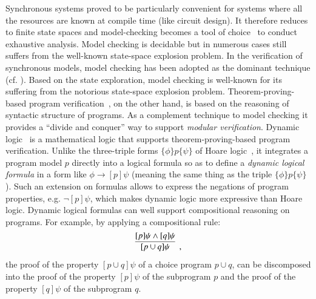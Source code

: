 \documentclass{fcs}
\begin{document}
Synchronous systems proved to be particularly convenient for systems where all the resources are known at compile time (like circuit design).
It therefore reduces to finite state spaces and model-checking becomes a tool of choice~\cite{Halbwachs93b,Pilaud88,Jagadeesan95,Andre09,Berry85,Halbwachs91} to conduct exhaustive analysis.
Model checking is decidable but in numerous cases still suffers from the well-known state-space explosion problem.
\ifx  
In the verification of synchronous models, model checking has been adopted as the dominant technique (cf. \cite{Halbwachs93b,Pilaud88,Jagadeesan95,Andre09,Berry85,Halbwachs91}).
Based on the state exploration, model checking is well-known for its suffering from the notorious state-space explosion problem.
\fi
Theorem-proving-based program verification~\cite{ProgramVerifications09}, on the other hand, is based on the reasoning of syntactic structure of programs.
As a complement technique to model checking it provides a ``divide and conquer'' way to support \emph{modular verification}.
Dynamic logic~\cite{Pratt76} is a mathematical logic that supports theorem-proving-based program verification.
Unlike the three-triple forms $\{\phi\}p\{\psi\}$ of Hoare logic~\cite{Hoare63}, it integrates a program model $p$
directly into a logical formula so as to define a \emph{dynamic logical formula} in a form like $\phi\to [p]\psi$ (meaning the same thing as the triple $\{\phi\}p\{\psi\}$).
Such an extension on formulas allows to express the negations of program properties, e.g. $\neg [p]\psi$, which makes dynamic logic more expressive than Hoare logic.
Dynamic logical formulas can well support compositional reasoning on programs.
For example, by applying a compositional rule:
$$
\infer[]{
[p\cup q]\psi
}
{
[p]\psi \wedge [q]\psi
}
,$$ the proof of the property $[p\cup q]\psi$ of a choice program $p\cup q$, can be discomposed into the proof of the property $[p]\psi$ of the subprogram $p$ and
the proof of the property $[q]\psi$ of the subprogram $q$.
\end{document}
